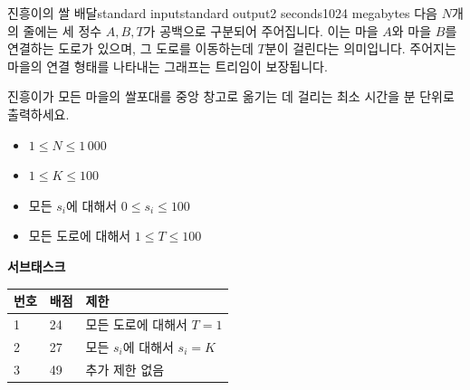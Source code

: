 \begin{problem}{진흥이의 쌀 배달}{standard input}{standard output}{2 seconds}{1024 megabytes}
다음 $N$개의 줄에는 세 정수 $A, B, T$가 공백으로 구분되어 주어집니다. 이는 마을 $A$와 마을 $B$를 연결하는 도로가 있으며, 그 도로를 이동하는데 $T$분이 걸린다는 의미입니다.
주어지는 마을의 연결 형태를 나타내는 그래프는 트리임이 보장됩니다.

\OutputFile
진흥이가 모든 마을의 쌀포대를 중앙 창고로 옮기는 데 걸리는 최소 시간을 분 단위로 출력하세요.

\Scoring
\begin{itemize}
\item $1 \le N \le 1\,000$
\item $1 \le K \le 100$
\item 모든 $s_i$에 대해서 $0 \le s_{i} \le 100$
\item 모든 도로에 대해서 $1 \le T \le 100$
\end{itemize}

\textbf{서브태스크}
\begin{tabular}{|l|l|l|} \hline
  \textbf{번호} & \textbf{배점} & \textbf{제한} \\ \hline
  1 & 24 & 모든 도로에 대해서 $T = 1$ \\ \hline
  2 & 27 & 모든 $s_i$에 대해서 $s_i = K$ \\ \hline
  3 & 49 & 추가 제한 없음 \\ \hline
\end{tabular}

\Examples

\begin{example}
%
%
\end{example}

\end{problem}

